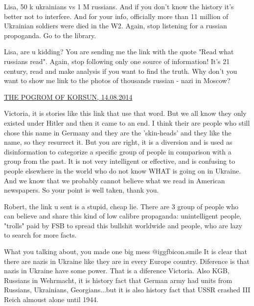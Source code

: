 \begin{itemize}
\begin{itemize}

Lisa, 50 k ukrainians vs 1 M russians. And if you don't know the history it's
better not to interfere. And for your info, officially more than 11 million of
Ukrainian soldiers were died in the W2. Again, stop listening for a russian
propoganda. Go to the library.



Lisa, are u kidding? You are sending me the link with the quote "Read what
russians read". Again, stop following only one source of information! It's 21
century, read and make analysis if you want to find the truth. Why don't you
want to show me link to the photos of thousands russian - nazi in Moscow?


\href{https://ukraine-human-rights.org/the-pogrom-of-korsun/}{%
THE POGROM OF KORSUN, 14.08.2014%
}


Victoria, it is stories like this link that use that word. But we all know they
only existed under Hitler and then it came to an end. I think their are people
who still chose this name in Germany and they are the 'skin-heads' and they
like the name, so they resurrect it. But you are right, it is a diversion and
is used as disinformation to categorize a specific group of people in
comparison with a group from the past. It is not very intelligent or effective,
and is confusing to people elsewhere in the world who do not know WHAT is going
on in Ukraine. And we know that we probably cannot believe what we read in
American newspapers. So your point is well taken, thank you.



Robert, the link u sent is a stupid, cheap lie. There are 3 group of people who
can believe and share this kind of low calibre propaganda: unintelligent
people, "trolls" paid by FSB to spread this bullshit worldwide and people, who
are lazy to search for more facts.


What you talking about, you made one big mess  @igg{fbicon.smile}  It is clear that there are
nazis in Ukraine like they are in every Europe country. Diference is that nazis
in Ukraine have some power. That is a diference Victoria. Also KGB, Russians in
Wehrmacht, it is history fact that German army had units from Russians,
Ukrainians, Georgians...but it is also history fact that USSR crashed III Reich
almoust alone until 1944.


\end{itemize}
\end{itemize}
